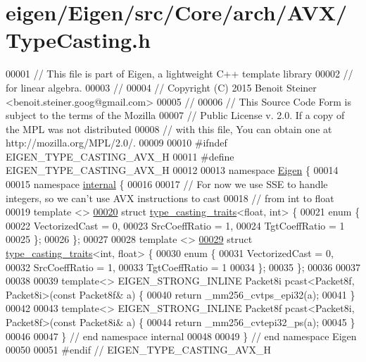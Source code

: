 \hypertarget{eigen_2_eigen_2src_2_core_2arch_2_a_v_x_2_type_casting_8h_source}{}\section{eigen/\+Eigen/src/\+Core/arch/\+A\+V\+X/\+Type\+Casting.h}
\label{eigen_2_eigen_2src_2_core_2arch_2_a_v_x_2_type_casting_8h_source}

\begin{DoxyCode}
00001 \textcolor{comment}{// This file is part of Eigen, a lightweight C++ template library}
00002 \textcolor{comment}{// for linear algebra.}
00003 \textcolor{comment}{//}
00004 \textcolor{comment}{// Copyright (C) 2015 Benoit Steiner <benoit.steiner.goog@gmail.com>}
00005 \textcolor{comment}{//}
00006 \textcolor{comment}{// This Source Code Form is subject to the terms of the Mozilla}
00007 \textcolor{comment}{// Public License v. 2.0. If a copy of the MPL was not distributed}
00008 \textcolor{comment}{// with this file, You can obtain one at http://mozilla.org/MPL/2.0/.}
00009 
00010 \textcolor{preprocessor}{#ifndef EIGEN\_TYPE\_CASTING\_AVX\_H}
00011 \textcolor{preprocessor}{#define EIGEN\_TYPE\_CASTING\_AVX\_H}
00012 
00013 \textcolor{keyword}{namespace }\hyperlink{namespace_eigen}{Eigen} \{
00014 
00015 \textcolor{keyword}{namespace }\hyperlink{namespaceinternal}{internal} \{
00016 
00017 \textcolor{comment}{// For now we use SSE to handle integers, so we can't use AVX instructions to cast}
00018 \textcolor{comment}{// from int to float}
00019 \textcolor{keyword}{template} <>
\hyperlink{struct_eigen_1_1internal_1_1type__casting__traits_3_01float_00_01int_01_4}{00020} \textcolor{keyword}{struct }\hyperlink{struct_eigen_1_1internal_1_1type__casting__traits}{type\_casting\_traits}<float, int> \{
00021   \textcolor{keyword}{enum} \{
00022     VectorizedCast = 0,
00023     SrcCoeffRatio = 1,
00024     TgtCoeffRatio = 1
00025   \};
00026 \};
00027 
00028 \textcolor{keyword}{template} <>
\hyperlink{struct_eigen_1_1internal_1_1type__casting__traits_3_01int_00_01float_01_4}{00029} \textcolor{keyword}{struct }\hyperlink{struct_eigen_1_1internal_1_1type__casting__traits}{type\_casting\_traits}<int, float> \{
00030   \textcolor{keyword}{enum} \{
00031     VectorizedCast = 0,
00032     SrcCoeffRatio = 1,
00033     TgtCoeffRatio = 1
00034   \};
00035 \};
00036 
00037 
00038 
00039 \textcolor{keyword}{template}<> EIGEN\_STRONG\_INLINE Packet8i pcast<Packet8f, Packet8i>(\textcolor{keyword}{const} Packet8f& a) \{
00040   \textcolor{keywordflow}{return} \_mm256\_cvtps\_epi32(a);
00041 \}
00042 
00043 \textcolor{keyword}{template}<> EIGEN\_STRONG\_INLINE Packet8f pcast<Packet8i, Packet8f>(\textcolor{keyword}{const} Packet8i& a) \{
00044   \textcolor{keywordflow}{return} \_mm256\_cvtepi32\_ps(a);
00045 \}
00046 
00047 \} \textcolor{comment}{// end namespace internal}
00048 
00049 \} \textcolor{comment}{// end namespace Eigen}
00050 
00051 \textcolor{preprocessor}{#endif // EIGEN\_TYPE\_CASTING\_AVX\_H}
\end{DoxyCode}
